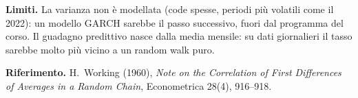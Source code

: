 \documentclass[11pt,a4paper]{article}
\begin{document}
\textbf{Limiti.} La varianza non è modellata (code spesse, periodi più volatili come il 2022): un modello GARCH sarebbe il passo successivo, fuori dal programma del corso. Il guadagno predittivo nasce dalla media mensile: su dati giornalieri il tasso sarebbe molto più vicino a un random walk puro.

\vspace{0.8em}
{\small\textbf{Riferimento.} H.~Working (1960), \emph{Note on the Correlation of First Differences of Averages in a Random Chain}, Econometrica 28(4), 916--918.}
\end{document}
